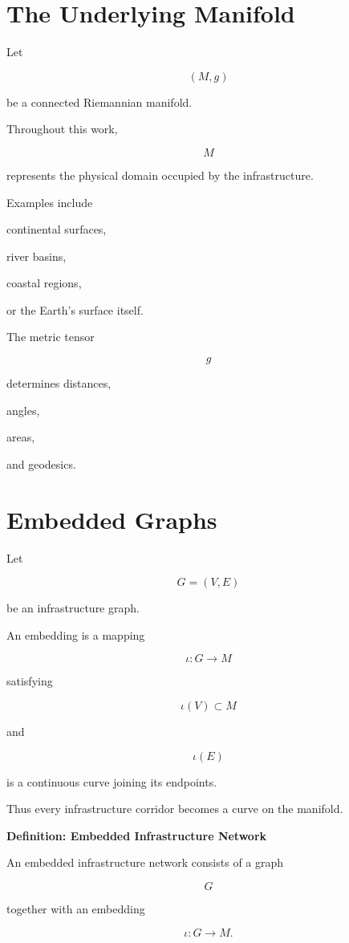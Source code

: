 \documentclass[11pt,fleqn]{book}
\numberwithin{equation}{chapter}
\newenvironment{definition}[1]
  {\begin{definitionEnv}
   \noindent\textbf{Definition: #1}\par\smallskip}
  {\end{definitionEnv}}
\theoremstyle{plain}
\theoremstyle{definition}
\theoremstyle{remark}
\begin{document}
\section{The Underlying Manifold}

Let

\[
(M,g)
\]

be a connected Riemannian manifold.

Throughout this work,

\[
M
\]

represents the physical domain occupied by the infrastructure.

Examples include

continental surfaces,

river basins,

coastal regions,

or the Earth's surface itself.

The metric tensor

\[
g
\]

determines distances,

angles,

areas,

and geodesics.


\section{Embedded Graphs}

Let

\[
G=(V,E)
\]

be an infrastructure graph.

An embedding is a mapping

\[
\iota:G\rightarrow M
\]

satisfying

\[
\iota(V)\subset M
\]

and

\[
\iota(E)
\]

is a continuous curve joining its endpoints.

Thus every infrastructure corridor becomes a curve on the manifold.


\begin{definition}{Embedded Infrastructure Network}

An embedded infrastructure network consists of a graph

\[
G
\]

together with an embedding

\[
\iota:G\rightarrow M.
\]

\end{definition}
\end{document}
